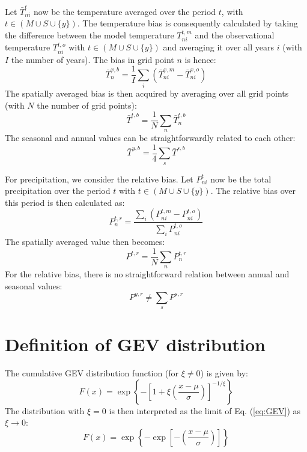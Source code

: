 \documentclass[journal abbreviation, manuscript]{copernicus}
\begin{document}
Let $\bar{T}^{t}_{ni}$ now be the temperature averaged over the period $t$, with $t \in (M \cup S \cup \{y\})$. The temperature bias is consequently calculated by taking the difference between the model temperature $T^{t,m}_{ni}$ and the observational temperature $T^{t,o}_{ni}$ with $t \in (M \cup S \cup \{y\})$ and averaging it over all years $i$ (with $I$ the number of years). The bias in grid point $n$ is hence:
\begin{equation*}
    \bar{T}^{x,b}_{n} = \frac{1}{I} \sum_{i} \left(\bar{T}^{x,m}_{ni} - \bar{T}^{x,o}_{ni} \right)
\end{equation*}
The spatially averaged bias is then acquired by averaging over all grid points (with $N$ the number of grid points):
\begin{equation*}
    \bar{T}^{t,b} = \frac{1}{N} \sum_{n} \bar{T}^{t,b}_{n} 
\end{equation*}
The seasonal and annual values can be straightforwardly related to each other:
\begin{equation*}
    \bar{T}^{y,b} = \frac{1}{4} \sum_{s} \bar{T}^{s,b}
\end{equation*}

For precipitation, we consider the relative bias. Let $P^{t}_{ni}$ now be the total precipitation over the period $t$ with $t \in (M \cup S \cup \{y\})$. The relative bias over this period is then calculated as:
\begin{equation*}
    P^{t,r}_{n} = \frac{ \sum_{i} \left(P^{t,m}_{ni} - P^{t,o}_{ni} \right)}{\sum_{i} P^{t,o}_{ni}}
\end{equation*}
The spatially averaged value then becomes:
\begin{equation*}
    P^{t,r} = \frac{1}{N} \sum_{n} P^{t,r}_{n}
\end{equation*}
For the relative bias, there is no straightforward relation between annual and seasonal values: 
\begin{equation*}
    P^{y,r} \neq \sum_{s} P^{s,r}
\end{equation*}

\section{Definition of GEV distribution}
\label{sect:gev_definition}

The cumulative GEV distribution function (for $\xi \neq 0$) is given by: 
\begin{equation}
    F(x) = \exp \left\{- \left[1 + \xi \left(\frac{x - \mu}{\sigma} \right) \right]^{-1/\xi} \right\}
\label{eq:GEV}
\end{equation}
The distribution with $\xi = 0$ is then interpreted as the limit of Eq. (\ref{eq:GEV}) as $\xi \to 0$:
\begin{equation}
    F(x) = \exp \left\{- \exp \left[- \left(\frac{x - \mu}{\sigma} \right) \right] \right\}
\label{eq:GEV0}
\end{equation}
\end{document}

